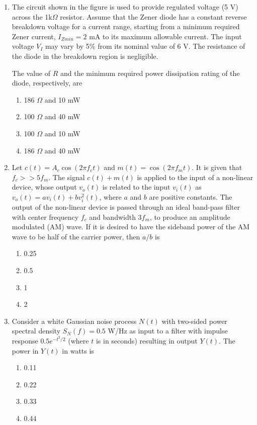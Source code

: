 \documentclass{article}
\begin{document}
\begin{enumerate}
\item The circuit shown in the figure is used to provide regulated voltage (5 V) across the 1k$\Omega$ resistor. Assume that the Zener diode has a constant reverse breakdown voltage for a current range, starting from a minimum required Zener current, $I_{Zmin} = 2$ mA to its maximum allowable current. The input voltage $V_I$ may vary by 5\% from its nominal value of 6 V. The resistance of the diode in the breakdown region is negligible.
\begin{figure}[H]
    \centering
    
    \caption{}
    \label{fig:q36}
\end{figure}
The value of $R$ and the minimum required power dissipation rating of the diode, respectively, are
\begin{enumerate}
\item 186 $\Omega$ and 10 mW
\item 100 $\Omega$ and 40 mW
\item 100 $\Omega$ and 10 mW
\item 186 $\Omega$ and 40 mW
\end{enumerate}

\item Let $c(t) = A_c \cos(2\pi f_c t)$ and $m(t) = \cos(2\pi f_m t)$. It is given that $f_c >> 5f_m$. The signal $c(t) + m(t)$ is applied to the input of a non-linear device, whose output $v_o(t)$ is related to the input $v_i(t)$ as $v_o(t) = av_i(t) + bv_i^2(t)$, where $a$ and $b$ are positive constants. The output of the non-linear device is passed through an ideal band-pass filter with center frequency $f_c$ and bandwidth $3f_m$, to produce an amplitude modulated (AM) wave. If it is desired to have the sideband power of the AM wave to be half of the carrier power, then $a/b$ is
\begin{multicols}{4}
\begin{enumerate}
\item 0.25
\item 0.5
\item 1
\item 2
\end{enumerate}
\end{multicols}

\item Consider a white Gaussian noise process $N(t)$ with two-sided power spectral density $S_N(f) = 0.5$ W/Hz as input to a filter with impulse response $0.5e^{-t^2/2}$ (where $t$ is in seconds) resulting in output $Y(t)$. The power in $Y(t)$ in watts is
\begin{multicols}{4}
\begin{enumerate}
\item 0.11
\item 0.22
\item 0.33
\item 0.44
\end{enumerate}
\end{multicols}


\end{enumerate}
\end{document}
